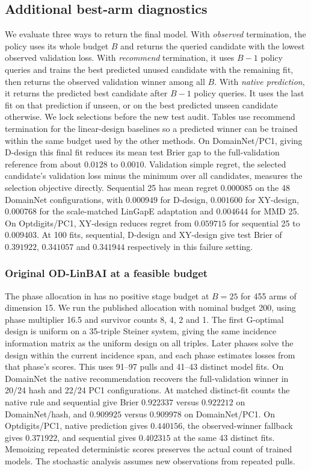 \documentclass{article}
\begin{document}
\subsection{Additional best-arm diagnostics}

We evaluate three ways to return the final model. With \emph{observed} termination, the policy uses its whole budget $B$ and returns the queried candidate with the lowest observed validation loss. With \emph{recommend} termination, it uses $B-1$ policy queries and trains the best predicted unused candidate with the remaining fit, then returns the observed validation winner among all $B$. With \emph{native prediction}, it returns the predicted best candidate after $B-1$ policy queries. It uses the last fit on that prediction if unseen, or on the best predicted unseen candidate otherwise. We lock selections before the new test audit. Tables use recommend termination for the linear-design baselines so a predicted winner can be trained within the same budget used by the other methods. On DomainNet/PC1, giving D-design this final fit reduces its mean test Brier gap to the full-validation reference from about $0.0128$ to $0.0010$. Validation simple regret, the selected candidate's validation loss minus the minimum over all candidates, measures the selection objective directly. Sequential 25 has mean regret $0.000085$ on the 48 DomainNet configurations, with $0.000949$ for D-design, $0.001600$ for XY-design, $0.000768$ for the scale-matched LinGapE adaptation and $0.004644$ for MMD 25. On Optdigits/PC1, XY-design reduces regret from $0.059715$ for sequential 25 to $0.009403$. At 100 fits, sequential, D-design and XY-design give test Brier of $0.391922$, $0.341057$ and $0.341944$ respectively in this failure setting.

\subsubsection{Original OD-LinBAI at a feasible budget}
The phase allocation in \citet[Eq.~1]{yangtan2022linbai} has no positive stage budget at $B=25$ for 455 arms of dimension 15. We run the published allocation with nominal budget 200, using phase multiplier 16.5 and survivor counts 8, 4, 2 and 1. The first G-optimal design is uniform on a 35-triple Steiner system, giving the same incidence information matrix as the uniform design on all triples. Later phases solve the design within the current incidence span, and each phase estimates losses from that phase's scores. This uses 91--97 pulls and 41--43 distinct model fits. On DomainNet the native recommendation recovers the full-validation winner in 20/24 hash and 22/24 PC1 configurations. At matched distinct-fit counts the native rule and sequential give Brier $0.922337$ versus $0.922212$ on DomainNet/hash, and $0.909925$ versus $0.909978$ on DomainNet/PC1. On Optdigits/PC1, native prediction gives $0.440156$, the observed-winner fallback gives $0.371922$, and sequential gives $0.402315$ at the same 43 distinct fits. Memoizing repeated deterministic scores preserves the actual count of trained models. The stochastic analysis assumes new observations from repeated pulls.
\end{document}
